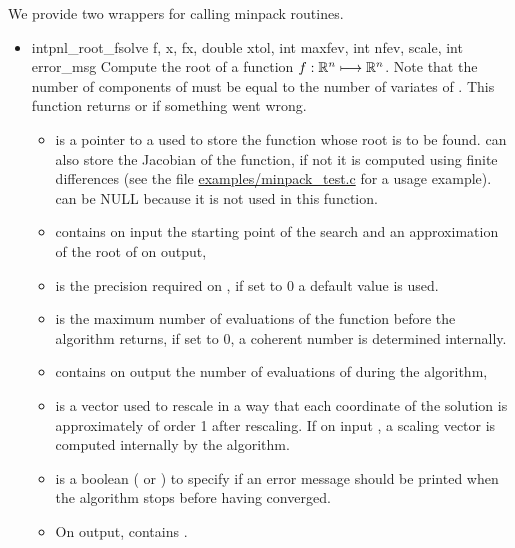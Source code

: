 We provide two wrappers for calling minpack routines.
\begin{itemize}
\item \describefun
  {int}{pnl_root_fsolve}{ \ptr f,
    \PnlVect \ptr x, \PnlVect \ptr fx, double xtol,
    int maxfev, int \ptr nfev, \PnlVect \ptr scale, int
    error_msg}
  \sshortdescribe Compute the root of a function $f:{\mathbb R}^n \longmapsto
  {\mathbb R}^n$. Note that the number of components of  must be equal to the
  number of variates of . This function returns  or
   if something went wrong.
  \parameters
  \begin{itemize}
  \item {} is a pointer to a  used to
    store the function whose root is to be found.  can also
    store the Jacobian of the function, if not it is computed using
    finite differences (see the file \url{examples/minpack_test.c} for
    a usage example).  can be NULL because it is
    not used in this function.
  \item  {} contains on input the starting point of the search and
    an approximation of the root of  on output,
  \item {} is the precision required on , if set to 0 a
    default value is used.
  \item {} is the maximum number of evaluations of the function
     before the algorithm returns, if set to 0, a coherent
    number is determined internally.
  \item {} contains on output the number of evaluations of
     during the algorithm,
  \item {} is a vector used to rescale  in a way that
    each coordinate of the solution is approximately of order 1 after
    rescaling. If on input , a scaling vector is
    computed internally by the algorithm.
  \item {} is a boolean
    ( or ) to specify if an error message should be
    printed when the algorithm stops before having converged.
  \item On output,  contains .
  \end{itemize}


\end{itemize}
